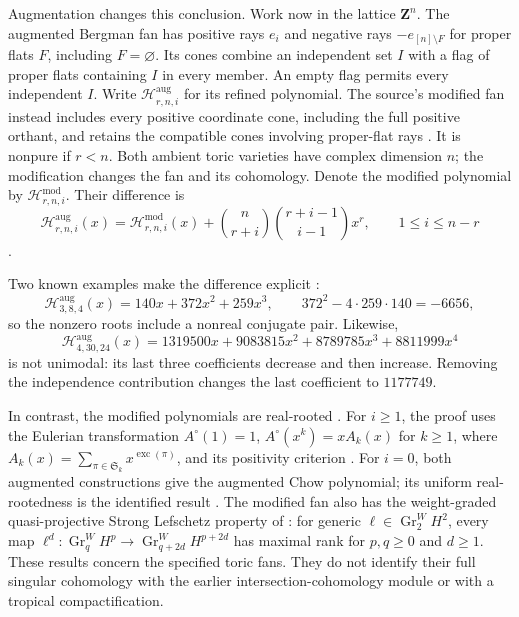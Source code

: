 Augmentation changes this conclusion. Work now in the lattice
$\mathbf Z^n$. The augmented Bergman fan has positive rays $e_i$
and negative rays $-e_{[n]\setminus F}$ for proper flats $F$,
including $F=\varnothing$. Its cones combine an independent
set $I$ with a flag of proper flats containing $I$ in every
member. An empty flag permits every independent $I$.
Write $\mathcal H^{\mathrm{aug}}_{r,n,i}$ for its refined
polynomial. The source's modified fan instead includes every
positive coordinate cone, including the full positive orthant,
and retains the compatible cones involving proper-flat rays
\cite[Definition~4.1]{BinderVecchi26AugmentedCohomology}.
It is nonpure if $r<n$. Both ambient toric varieties have complex
dimension $n$; the modification changes the fan and its cohomology.
Denote the modified polynomial by
$\mathcal H^{\mathrm{mod}}_{r,n,i}$. Their difference is
\[
 \mathcal H^{\mathrm{aug}}_{r,n,i}(x)
  =\mathcal H^{\mathrm{mod}}_{r,n,i}(x)
       +\binom{n}{r+i}\binom{r+i-1}{i-1}x^r,
 \qquad 1\le i\le n-r
\]
\cite[Proposition~6.6 and equation~(7)]
{BinderVecchi26AugmentedCohomology}.

Two known examples make the difference explicit
\cite[Example~7.5]{BinderVecchi26AugmentedCohomology}:
\[
 \mathcal H^{\mathrm{aug}}_{3,8,4}(x)=140x+372x^2+259x^3,
 \qquad 372^2-4\cdot259\cdot140=-6656,
\]
so the nonzero roots include a nonreal conjugate pair. Likewise,
\[
 \mathcal H^{\mathrm{aug}}_{4,30,24}(x)
   =1319500x+9083815x^2+8789785x^3+8811999x^4
\]
is not unimodal: its last three coefficients decrease and then
increase. Removing the independence contribution changes the
last coefficient to $1177749$.

In contrast, the modified polynomials are real-rooted
\cite[Theorem~1.6]{BinderVecchi26AugmentedCohomology}.
For $i\ge1$, the proof uses the Eulerian transformation
$A^\circ(1)=1$, $A^\circ(x^k)=xA_k(x)$ for $k\ge1$,
where $A_k(x)=\sum_{\pi\in\mathfrak S_k}x^{\operatorname{exc}(\pi)}$,
and its positivity criterion
\cite[Theorem~1.1]{Athanasiadis25Eulerian}.
For $i=0$, both augmented constructions give the augmented Chow
polynomial; its uniform real-rootedness is the identified result
\cite[Theorem~1.10]{FMSV24ChowSeries}.
The modified fan also has the weight-graded quasi-projective
Strong Lefschetz property of
\cite[Theorem~1.3]{BinderVecchi26AugmentedCohomology}:
for generic $\ell\in\operatorname{Gr}^W_2H^2$, every map
$\ell^d:\operatorname{Gr}^W_qH^p\to
\operatorname{Gr}^W_{q+2d}H^{p+2d}$ has maximal rank for
$p,q\ge0$ and $d\ge1$.
These results concern the specified toric fans. They do not
identify their full singular cohomology with the earlier
intersection-cohomology module or with a tropical compactification.

